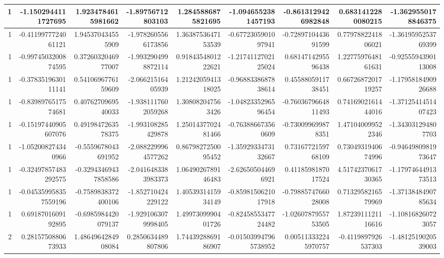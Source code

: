 \documentclass{jlreq}
\numberwithin{equation}{section}
\begin{document}
\begin{table}[H]
{\begin{tabular}{|r|r|r|r|r|r|r|r|r|}
      1 & -1.1502944111727695   & 1.9234784615981662    & -1.89756712803103    & 1.2845886875821695   & -1.0946552381457193   & -0.8613129426982848   & 0.6831412280080215    & -1.3629550178846375   \\ \hline
      1 & -0.4119977724061121   & 1.945370434555909     & -1.9782605566173856  & 1.3638753647153539   & -0.6772305901097941   & -0.7289710443691599   & 0.7797882241806021    & -1.3619595253769399   \\ \hline
      1 & -0.9974503200874595   & 0.3726032046977007    & -1.9932904998872114  & 0.9184354801222621   & -1.2174112702125024   & 0.6814714295596438    & 1.2277597648161631    & -0.9255594390113008   \\ \hline
      1 & -0.3783519630111141   & 0.5410696776159609    & -2.06621516405939    & 1.2124205941318025   & -0.9688338687838614   & 0.4558805911738451    & 0.6672687201719257    & -1.1795818490926688   \\ \hline
      1 & -0.8398976517574681   & 0.4076270969540033    & -1.9381117602059268  & 1.308082047563426    & -1.0482335296596454   & -0.7603679664811493   & 0.7416902161444016    & -1.3712541451407423   \\ \hline
      1 & -0.15197440905607076  & 0.4919847263578375    & -1.993108285429878   & 1.2501437702481466   & -0.763886673560609    & -0.730099699878351    & 1.471040099522346     & -1.343031294807703    \\ \hline
      1 & -1.052008274340966    & -0.5559678043691952   & -2.0882299964577262  & 0.8679827250095452   & -1.3592933473132667   & 0.7316772159768109    & 0.7304931940674996    & -0.9464980981973647   \\ \hline
      1 & -0.32497857483292575  & -0.32943469437858586  & -2.0416483383983373  & 1.0649026789146483   & -2.626505044696921    & 0.4118598187017524    & 4.5174237061730365    & -1.1797464491373513   \\ \hline
      1 & -0.045359958357559196 & -0.7589838372400106   & -1.852710424229122   & 1.4053931415934149   & -0.8598150621017918   & -0.7988574766028008   & 0.7132958216579969    & -1.3713848490785634   \\ \hline
      1 & 0.6918701609192895    & -0.6985984420079137   & -1.9291063079998405  & 1.4997309990401726   & -0.8245855347724482   & -1.0260787955753505   & 1.8723911121116616    & -1.108168260723057    \\ \hline
      2 & 0.2815750880673933    & 1.4864964284908084    & 0.2850634489807806   & 1.7443928869186907   & -0.015039947965738952 & 0.005113332245970757  & -0.4119897926537303   & -1.4812519020539003   \\ \hline

\end{tabular}}
\end{table}
\end{document}
